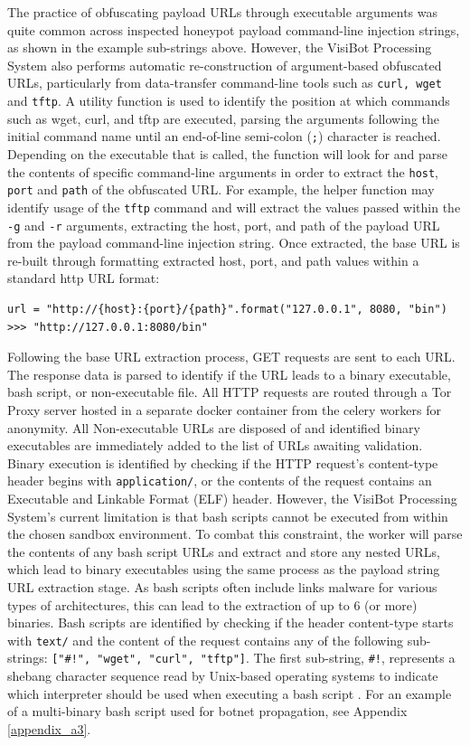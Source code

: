 The practice of obfuscating payload URLs through executable arguments was quite common across inspected honeypot payload command-line injection strings, as shown in the example sub-strings above. However, the VisiBot Processing System also performs automatic re-construction of argument-based obfuscated URLs, particularly from data-transfer command-line tools such as \texttt{curl, wget} and \texttt{tftp}. A utility function is used to identify the position at which commands such as wget, curl, and tftp are executed, parsing the arguments following the initial command name until an end-of-line semi-colon (\texttt{;}) character is reached. Depending on the executable that is called, the function will look for and parse the contents of specific command-line arguments in order to extract the \texttt{host}, \texttt{port} and \texttt{path} of the obfuscated URL. For example, the helper function may identify usage of the \texttt{tftp} command and will extract the values passed within the \texttt{-g} and \texttt{-r} arguments, extracting the host, port, and path of the payload URL from the payload command-line injection string. Once extracted, the base URL is re-built through formatting extracted host, port, and path values within a standard http URL format: 

\begin{lstlisting}
url = "http://{host}:{port}/{path}".format("127.0.0.1", 8080, "bin")
>>> "http://127.0.0.1:8080/bin"
\end{lstlisting}

Following the base URL extraction process, GET requests are sent to each URL. The response data is parsed to identify if the URL leads to a binary executable, bash script, or non-executable file. All HTTP requests are routed through a Tor Proxy server hosted in a separate docker container from the celery workers for anonymity. All Non-executable URLs are disposed of and identified binary executables are immediately added to the list of URLs awaiting validation. Binary execution is identified by checking if the HTTP request's content-type header begins with \texttt{application/}, or the contents of the request contains an Executable and Linkable Format (ELF) header. However, the VisiBot Processing System's current limitation is that bash scripts cannot be executed from within the chosen sandbox environment. To combat this constraint, the worker will parse the contents of any bash script URLs and extract and store any nested URLs, which lead to binary executables using the same process as the payload string URL extraction stage. As bash scripts often include links malware for various types of architectures, this can lead to the extraction of up to 6 (or more) binaries. Bash scripts are identified by checking if the header content-type starts with \texttt{text/} and the content of the request contains any of the following sub-strings: \texttt{["\#!", "wget", "curl", "tftp"]}. The first sub-string, \texttt{\#!}, represents a shebang character sequence read by Unix-based operating systems to indicate which interpreter should be used when executing a bash script \citep{Shebang}. For an example of a multi-binary bash script used for botnet propagation, see Appendix \ref{appendix_a3}.

